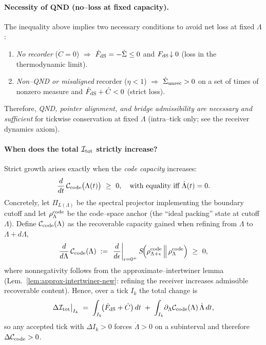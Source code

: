\documentclass[10pt]{article}
\theoremstyle{definition}
\theoremstyle{plain}
\begin{document}
\paragraph{Necessity of QND (no–loss at fixed capacity).}\label{par:uom-main-019}
The inequality above implies two necessary conditions to avoid net loss at fixed
$\Lambda$:
\begin{enumerate}[label=(\alph*),nosep]
\item \emph{No recorder} ($\dot C=0$) $\Rightarrow$
$\dot F_{\rm dS}=-\dot{\Sigma}\le0$ and $F_{\rm dS}\!\downarrow 0$ (loss in the
thermodynamic limit).
\item \emph{Non–QND or misaligned} recorder ($\eta<1$) $\Rightarrow$
$\dot{\Sigma}_{\rm unrec}>0$ on a set of times of nonzero measure and
$\dot F_{\rm dS}+\dot C<0$ (strict loss).
\end{enumerate}
Therefore, \emph{QND, pointer alignment, and bridge admissibility are necessary and
sufficient} for tickwise conservation at fixed $\Lambda$ (intra--tick only; see the
receiver dynamics axiom).

\paragraph{When does the total \(\mathcal I_{\rm tot}\) strictly increase?}\label{par:uom-main-020}
Strict growth arises exactly when the \emph{code capacity} increases:
\[
\frac{d}{dt}\,\mathcal C_{\rm code}\big(\Lambda(t)\big)\ \ge\ 0,
\quad\text{with equality iff }\dot\Lambda(t)=0.
\]
Concretely, let $\Pi_{L(\Lambda)}$ be the spectral projector implementing the boundary
cutoff and let $\rho^{\rm code}_\Lambda$ be the code–space anchor (the ``ideal packing''
state at cutoff $\Lambda$). Define $\mathcal C_{\rm code}(\Lambda)$ as the recoverable
capacity gained when refining from $\Lambda$ to $\Lambda+d\Lambda$,
\[
\frac{d}{d\Lambda}\,\mathcal C_{\rm code}(\Lambda)
\;:=\;\left.\frac{d}{d\epsilon}\right|_{\epsilon=0^+}
S\!\Big(\rho^{\rm code}_{\Lambda+\epsilon}\,\Big\|\,\rho^{\rm code}_{\Lambda}\Big)\ \ge\ 0,
\]
where nonnegativity follows from the approximate–intertwiner lemma
(Lem.~\ref{lem:approx-intertwiner-new}: refining the receiver increases admissible recoverable content).
Hence, over a tick $I_k$ the total change is
\[
\Delta\mathcal I_{\rm tot}\big|_{I_k}
\;=\;\int_{I_k}\!\!\big(\dot F_{\rm dS}+\dot C\big)\,dt\;+\;
\int_{I_k}\!\partial_\Lambda\mathcal C_{\rm code}(\Lambda)\,\dot\Lambda\,dt,
\]
so any accepted tick with $\Delta I_k>0$ forces $\dot\Lambda>0$ on a subinterval and
therefore $\Delta\mathcal C_{\rm code}>0$.
\end{document}
